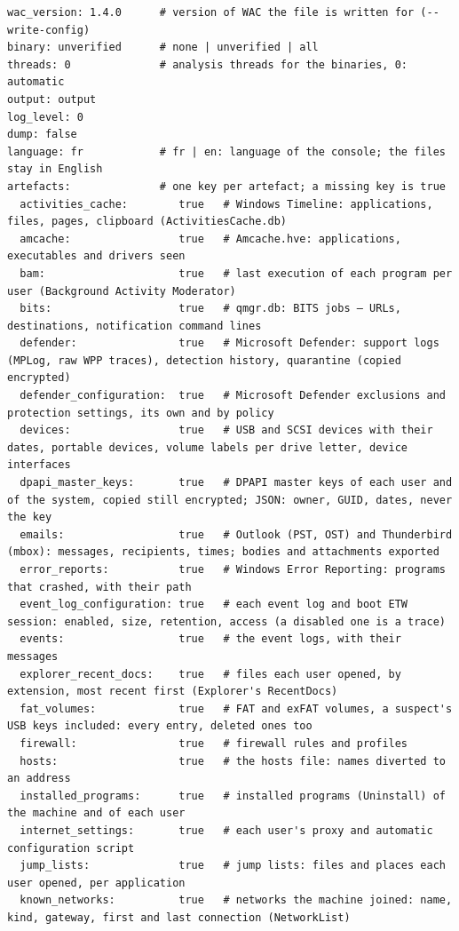 \documentclass[11pt,a4paper,oneside]{report}
\begin{document}
\begin{lstlisting}
wac_version: 1.4.0      # version of WAC the file is written for (--write-config)
binary: unverified      # none | unverified | all
threads: 0              # analysis threads for the binaries, 0: automatic
output: output
log_level: 0
dump: false
language: fr            # fr | en: language of the console; the files stay in English
artefacts:              # one key per artefact; a missing key is true
  activities_cache:        true   # Windows Timeline: applications, files, pages, clipboard (ActivitiesCache.db)
  amcache:                 true   # Amcache.hve: applications, executables and drivers seen
  bam:                     true   # last execution of each program per user (Background Activity Moderator)
  bits:                    true   # qmgr.db: BITS jobs — URLs, destinations, notification command lines
  defender:                true   # Microsoft Defender: support logs (MPLog, raw WPP traces), detection history, quarantine (copied encrypted)
  defender_configuration:  true   # Microsoft Defender exclusions and protection settings, its own and by policy
  devices:                 true   # USB and SCSI devices with their dates, portable devices, volume labels per drive letter, device interfaces
  dpapi_master_keys:       true   # DPAPI master keys of each user and of the system, copied still encrypted; JSON: owner, GUID, dates, never the key
  emails:                  true   # Outlook (PST, OST) and Thunderbird (mbox): messages, recipients, times; bodies and attachments exported
  error_reports:           true   # Windows Error Reporting: programs that crashed, with their path
  event_log_configuration: true   # each event log and boot ETW session: enabled, size, retention, access (a disabled one is a trace)
  events:                  true   # the event logs, with their messages
  explorer_recent_docs:    true   # files each user opened, by extension, most recent first (Explorer's RecentDocs)
  fat_volumes:             true   # FAT and exFAT volumes, a suspect's USB keys included: every entry, deleted ones too
  firewall:                true   # firewall rules and profiles
  hosts:                   true   # the hosts file: names diverted to an address
  installed_programs:      true   # installed programs (Uninstall) of the machine and of each user
  internet_settings:       true   # each user's proxy and automatic configuration script
  jump_lists:              true   # jump lists: files and places each user opened, per application
  known_networks:          true   # networks the machine joined: name, kind, gateway, first and last connection (NetworkList)

\end{lstlisting}
\end{document}
